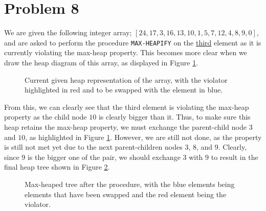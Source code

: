 \documentclass{report}
\begin{document}
\section{Problem 8}
We are given the following integer array; $[24, 17, 3, 16, 13, 10, 1, 5, 7, 12, 4, 8, 9, 0]$, and are asked to perform the procedure \lstinline|MAX-HEAPIFY| on the \underline{third} element as it is currently violating the max-heap property. This becomes more clear when we draw the heap diagram of this array, as displayed in Figure \ref{p8}.
\begin{figure}[H]
	\centering
	\caption{Current given heap representation of the array, with the violator highlighted in red and to be swapped with the element in blue.}
	\label{p8}
\end{figure}

From this, we can clearly see that the third element is violating the max-heap property as the child node $10$ is clearly bigger than it. Thus, to make sure this heap retains the max-heap property, we must exchange the parent-child node $3$ and $10$, as highlighted in Figure \ref{p8}. However, we are still not done, as the property is still not met yet due to the next parent-children nodes $3$, $8$, and $9$. Clearly, since $9$ is the bigger one of the pair, we should exchange $3$ with $9$ to result in the final heap tree shown in Figure \ref{p8-1}.
\begin{figure}[H]
	\centering
	\caption{Max-heaped tree after the procedure, with the blue elements being elements that have been swapped and the red element being the violator.}
	\label{p8-1}
\end{figure}
\end{document}
